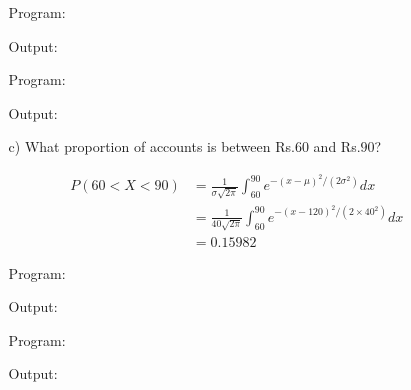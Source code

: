 \documentclass[a4paper,11pt,openright]{report}
\begin{document}
\begin{enumerate}
\begin{enumerate}
Program:

Output:


Program:

Output:


\pagebreak

\item[c)] What proportion of accounts is between Rs.$60$ and Rs.$90$?

\begin{equation*}
\begin{split}
P(60 < X < 90) &= \frac{1}{\sigma\sqrt{2\pi}} \int_{60}^{90} e^{-(x-\mu)^2/(2\sigma^{2})} dx \\
		&= \frac{1}{40\sqrt{2\pi}} \int_{60}^{90} e^{-(x-120)^2/(2 \times 40^{2})} dx \\
		&= 0.15982
\end{split}
\end{equation*}

Program:

Output:


Program:

Output:

\end{enumerate}

\end{enumerate}
\end{document}
